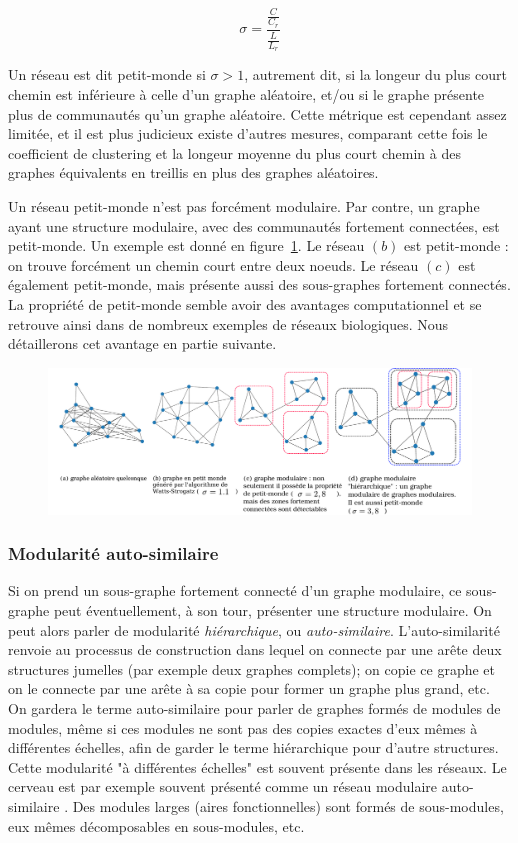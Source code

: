 $$\sigma = \frac{\frac{C}{C_r}}{\frac{L}{L_r}} $$

Un réseau est dit petit-monde si $\sigma > 1$, autrement dit, si la longeur du plus court chemin est inférieure à celle d'un graphe aléatoire, et/ou si le graphe présente plus de communautés qu'un graphe aléatoire. Cette métrique est cependant assez limitée, et il est plus judicieux existe d'autres mesures, comparant cette fois le coefficient de clustering et la longeur moyenne du plus court chemin à des graphes équivalents en treillis en plus des graphes aléatoires. 

Un réseau petit-monde n'est pas forcément modulaire. Par contre, un graphe ayant une structure modulaire, avec des communautés fortement connectées, est petit-monde. Un exemple est donné en figure~\ref{fig:graphe}. Le réseau $(b)$ est petit-monde : on trouve forcément un chemin court entre deux noeuds. Le réseau $(c)$ est également petit-monde, mais présente aussi des sous-graphes fortement connectés. 
La propriété de petit-monde semble avoir des avantages computationnel et se retrouve ainsi dans de nombreux exemples de réseaux biologiques. Nous détaillerons cet avantage en partie suivante. 

\begin{figure}
\centering
\includegraphics[width=\textwidth]{types_graphes.pdf}
\label{fig:graphe}
\end{figure}


\subsubsection{Modularité auto-similaire}

Si on prend un sous-graphe fortement connecté d'un graphe modulaire, ce sous-graphe peut éventuellement, à son tour, présenter une structure modulaire. On peut alors parler de modularité \emph{hiérarchique}, ou \emph{auto-similaire}. L'auto-similarité renvoie au processus de construction dans lequel on connecte par une arête deux structures jumelles (par exemple deux graphes complets); on copie ce graphe et on le connecte par une arête à sa copie pour former un graphe plus grand, etc. On gardera le terme auto-similaire pour parler de graphes formés de modules de modules, même si ces modules ne sont pas des copies exactes d'eux mêmes à différentes échelles, afin de garder le terme hiérarchique pour d'autre structures. Cette modularité "à différentes échelles" est souvent présente dans les réseaux. Le cerveau est par exemple souvent présenté comme un réseau modulaire auto-similaire \cite{Meunier2010ModularAH}. Des modules larges (aires fonctionnelles) sont formés de sous-modules, eux mêmes décomposables en sous-modules, etc. 

